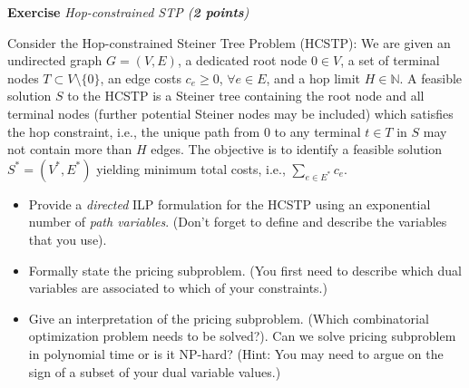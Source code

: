 \documentclass[a4paper,10pt]{article}
\newcounter{exc}
\newenvironment{exercise}[1]%
{\refstepcounter{exc}\textbf{Exercise \arabic{exc}} \emph{#1}\\}
{

\hrulefill\medskip}%
\newcommand{\N}{\mathbb{N}}
\begin{document}
\begin{exercise}{Hop-constrained STP (\textbf{2 points})}\label{ex:hcstp}

Consider the Hop-constrained Steiner Tree Problem (HCSTP): We are given an undirected graph $G=(V,E)$, a dedicated root node $0\in V$, a set of terminal nodes $T\subset V\setminus \{0\}$, an edge costs $c_e\ge 0$, $\forall e\in E$, and a hop limit $H\in \N$.
A feasible solution $S$ to the HCSTP is a Steiner tree containing the root node and all terminal nodes (further potential Steiner nodes may be included) which satisfies the hop constraint, i.e., the unique path from $0$ to any terminal $t\in T$ in $S$ may not contain more than $H$ edges. 
The objective is to identify a feasible solution $S^*=(V^*,E^*)$ yielding minimum total costs, i.e., $\sum_{e\in E^*} c_e$.

\begin{itemize}
\item Provide a \emph{directed} ILP formulation for the HCSTP using an exponential number of \emph{path variables}. (Don't forget to define and describe the variables that you use). 
\item Formally state the pricing subproblem. (You first need to describe which dual variables are associated to which of your constraints.)
\item Give an interpretation of the pricing subproblem. (Which combinatorial optimization problem needs to be solved?). Can we solve pricing subproblem in polynomial time or is it NP-hard? (Hint: You may need to argue on the sign of a subset of your dual variable values.)
\end{itemize}

\end{exercise}
\end{document}
